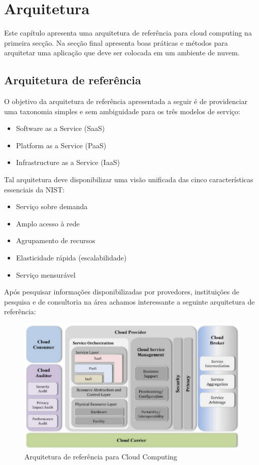 \chapter{Arquitetura}

Este capítulo apresenta uma arquitetura de referência para cloud computing na primeira secção. Na secção final apresenta boas práticas e métodos para arquitetar uma aplicação que deve ser colocada em um ambiente de nuvem.

\section{Arquitetura de referência}

O objetivo da arquitetura de referência apresentada a seguir é de providenciar uma taxonomia simples e sem ambiguidade para os três modelos de serviço:

\begin{itemize}
  \item
    Software as a Service (SaaS)
  \item
    Platform as a Service (PaaS)
  \item
    Infrastructure as a Service (IaaS)
\end{itemize}

Tal arquitetura deve disponibilizar uma visão unificada das cinco características essenciais da NIST:

\begin{itemize}
  \item Serviço sobre demanda
  \item Amplo acesso à rede
  \item Agrupamento de recursos
  \item Elasticidade rápida (escalabilidade)
  \item Serviço mensurável
\end{itemize}

Após pesquisar informações disponibilizadas por provedores, instituições de pesquisa e de consultoria na área achamos interessante a seguinte arquitetura de referência:

\begin{figure}[h!]
  \centering
  \includegraphics[scale=0.5]{imagens/cloudarch.eps}
  \caption{Arquitetura de referência para Cloud Computing}
\end{figure}

